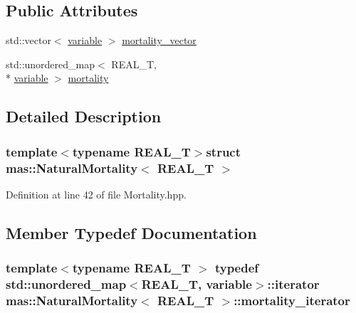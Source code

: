 \subsection*{Public Attributes}
\begin{DoxyCompactItemize}
\item 
std\-::vector$<$ \hyperlink{structmas_1_1_natural_mortality_a6f9549336ac14a2e7c2f587af6b066da}{variable} $>$ \hyperlink{structmas_1_1_natural_mortality_a3f161a8dcbf17c626f49d3e3bdb0afdf}{mortality\-\_\-vector}
\item 
std\-::unordered\-\_\-map$<$ R\-E\-A\-L\-\_\-\-T, \\*
\hyperlink{structmas_1_1_natural_mortality_a6f9549336ac14a2e7c2f587af6b066da}{variable} $>$ \hyperlink{structmas_1_1_natural_mortality_af324ad56891a3268c7ed06cd6fe5e1b0}{mortality}
\end{DoxyCompactItemize}


\subsection{Detailed Description}
\subsubsection*{template$<$typename R\-E\-A\-L\-\_\-\-T$>$struct mas\-::\-Natural\-Mortality$<$ R\-E\-A\-L\-\_\-\-T $>$}



Definition at line 42 of file Mortality.\-hpp.



\subsection{Member Typedef Documentation}
\hypertarget{structmas_1_1_natural_mortality_a8c522fde4eb83dd74a0046d6b29cf807}{
\subsubsection[{mortality\-\_\-iterator}]{\setlength{\rightskip}{0pt plus 5cm}template$<$typename R\-E\-A\-L\-\_\-\-T $>$ typedef std\-::unordered\-\_\-map$<$R\-E\-A\-L\-\_\-\-T, {\bf variable}$>$\-::iterator {\bf mas\-::\-Natural\-Mortality}$<$ R\-E\-A\-L\-\_\-\-T $>$\-::{\bf mortality\-\_\-iterator}}}\label{structmas_1_1_natural_mortality_a8c522fde4eb83dd74a0046d6b29cf807}



